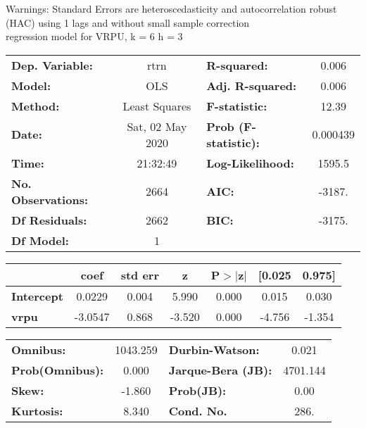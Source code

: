 Warnings: \newline
 [1] Standard Errors are heteroscedasticity and autocorrelation robust (HAC) using 1 lags and without small sample correction\\ 

regression model for VRPU, k = 6 h = 3\begin{center}
\begin{tabular}{lclc}
\toprule
\textbf{Dep. Variable:}    &       rtrn       & \textbf{  R-squared:         } &     0.006   \\
\textbf{Model:}            &       OLS        & \textbf{  Adj. R-squared:    } &     0.006   \\
\textbf{Method:}           &  Least Squares   & \textbf{  F-statistic:       } &     12.39   \\
\textbf{Date:}             & Sat, 02 May 2020 & \textbf{  Prob (F-statistic):} &  0.000439   \\
\textbf{Time:}             &     21:32:49     & \textbf{  Log-Likelihood:    } &    1595.5   \\
\textbf{No. Observations:} &        2664      & \textbf{  AIC:               } &    -3187.   \\
\textbf{Df Residuals:}     &        2662      & \textbf{  BIC:               } &    -3175.   \\
\textbf{Df Model:}         &           1      & \textbf{                     } &             \\
\bottomrule
\end{tabular}
\begin{tabular}{lcccccc}
                   & \textbf{coef} & \textbf{std err} & \textbf{z} & \textbf{P$> |$z$|$} & \textbf{[0.025} & \textbf{0.975]}  \\
\midrule
\textbf{Intercept} &       0.0229  &        0.004     &     5.990  &         0.000        &        0.015    &        0.030     \\
\textbf{vrpu}      &      -3.0547  &        0.868     &    -3.520  &         0.000        &       -4.756    &       -1.354     \\
\bottomrule
\end{tabular}
\begin{tabular}{lclc}
\textbf{Omnibus:}       & 1043.259 & \textbf{  Durbin-Watson:     } &    0.021  \\
\textbf{Prob(Omnibus):} &   0.000  & \textbf{  Jarque-Bera (JB):  } & 4701.144  \\
\textbf{Skew:}          &  -1.860  & \textbf{  Prob(JB):          } &     0.00  \\
\textbf{Kurtosis:}      &   8.340  & \textbf{  Cond. No.          } &     286.  \\
\bottomrule
\end{tabular}
\end{center}

